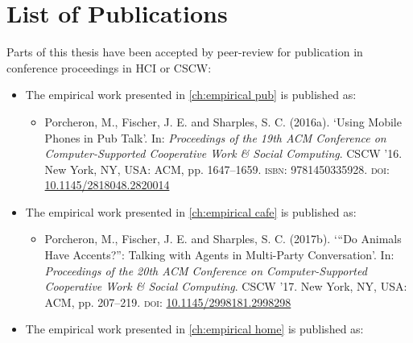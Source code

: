 


\chapter*{List of Publications}%
Parts of this thesis have been accepted by peer-review for publication in conference proceedings in \ac{HCI} or \ac{CSCW}:
\begin{itemize}

    \item The empirical work presented in \autoref{ch:empirical pub} is published as:
    \begin{itemize}

        \item Porcheron, M., Fischer, J. E. and Sharples, S. C. (2016a). ‘Using Mobile Phones in Pub Talk’. In: \textit{Proceedings of the 19th ACM Conference on Computer-Supported Cooperative Work \& Social Computing}. CSCW ’16. New York, NY, USA: ACM, pp. 1647–1659. \textsc{isbn:} 9781450335928. \textsc{doi:} \\\href{https://doi.org/10.1145/2818048.2820014}{10.1145/2818048.2820014}

    \end{itemize}

    \item The empirical work presented in \autoref{ch:empirical cafe} is published as:
    \begin{itemize}

        \item Porcheron, M., Fischer, J. E. and Sharples, S. C. (2017b). ‘``Do Animals Have Accents?'': Talking with Agents in Multi-Party Conversation’. In: \textit{Proceedings of the 20th ACM Conference on Computer-Supported Cooperative Work \& Social Computing}. CSCW ’17. New York, NY, USA: ACM, pp. 207–219. \textsc{doi:} \href{https://doi.org/10.1145/2998181.2998298}{10.1145/2998181.2998298}

    \end{itemize}

    \item The empirical work presented in \autoref{ch:empirical home} is published as:
    \begin{itemize}


\end{itemize}
\end{itemize}
